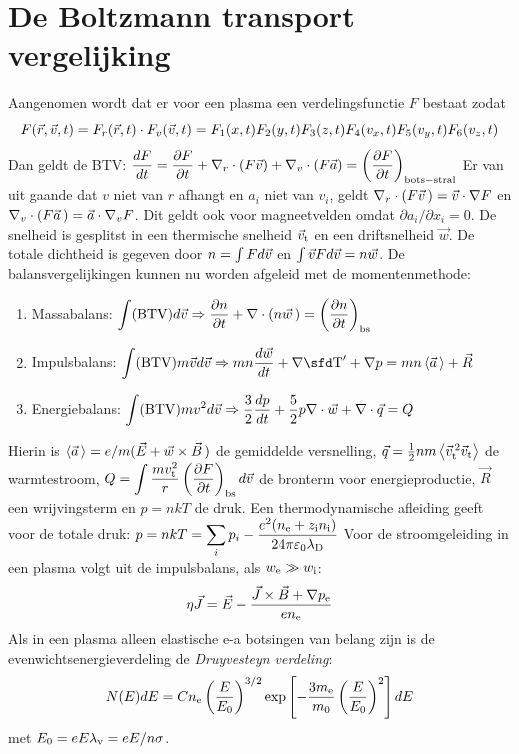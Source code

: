 \documentclass[twoside]{report}
\begin{document}
\section{De Boltzmann transport vergelijking}
Aangenomen wordt dat er voor een plasma een verdelingsfunctie $F$ bestaat zodat
\[
F(\rr,\vv,t)=F_r(\rr,t)\cdot F_v(\vv,t)=F_1(x,t)F_2(y,t)F_3(z,t)F_4(v_x,t)F_5(v_y,t)F_6(v_z,t)
\]
Dan geldt de BTV:
$\displaystyle
\frac{dF}{dt}=\Q{F}{t}+\nabla_r\cdot(F\vv)+\nabla_v\cdot(F\aaa)=\Qc{F}{t}{\rm bots-stral}
$
\npar
Er van uit gaande dat $v$ niet van $r$ afhangt en $a_i$ niet van $v_i$, geldt
$\nabla_r\cdot(F\vv\,)=\vv\cdot\nabla F$ en
$\nabla_v\cdot(F\aaa\,)=\aaa\cdot\nabla_vF$. Dit geldt ook voor magneetvelden
omdat $\partial a_i/\partial x_i=0$. De snelheid is gesplitst in een
thermische snelheid $\vv_{\rm t}$ en een driftsnelheid $\vec{w}$. De totale
dichtheid is gegeven door $n=\int Fd\vv$ en $\int\vv Fd\vv=n\vec{w}$.
\npar
De balansvergelijkingen kunnen nu worden afgeleid met de momentenmethode:
\begin{enumerate}
\item Massabalans: $\displaystyle\int({\rm BTV})d\vv\Rightarrow\Q{n}{t}+\nabla\cdot(n\vvec{w})=\Qc{n}{t}{\rm bs}$
\item Impulsbalans: $\displaystyle\int({\rm BTV})m\vv d\vv\Rightarrow mn\frac{d\vec{w}}{dt}+\nabla \TT'+\nabla p=mn\av{\aaa\,}+\vec{R}$
\item Energiebalans: $\displaystyle\int({\rm BTV})mv^2d\vv\Rightarrow\frac{3}{2}\frac{dp}{dt}+\frac{5}{2}p\nabla\cdot\vec{w}+\nabla\cdot\vec{q}=Q$
\end{enumerate}
Hierin is $\av{\aaa\,}=e/m(\vec{E}+\vec{w}\times\vvec{B})$ de gemiddelde
versnelling, $\vec{q}=\half nm\av{\vv_{\rm t}^{\,2}\vv_{\rm t}}$ de warmtestroom,
$\displaystyle Q=\int\frac{mv_{\rm t}^2}{r}\Qc{F}{t}{\rm bs}d\vv$ de bronterm
voor energieproductie, $\vec{R}$ een wrijvingsterm en $p=nkT$ de druk.
\npar
Een thermodynamische afleiding geeft voor de totale druk:
$\displaystyle p=nkT=\sum_ip_i-\frac{e^2(\ne+z_{\rm i}\ni)}{24\pi\varepsilon_0\lambda_{\rm D}}$
\npar
Voor de stroomgeleiding in een plasma volgt uit de impulsbalans, als
$w_{\rm e}\gg w_{\rm i}$:
\[
\eta\vec{J}=\vec{E}-\frac{\vec{J}\times\vec{B}+\nabla p_{\rm e}}{e\ne}
\]
Als in een plasma alleen elastische e-a botsingen van belang zijn is de
evenwichtsenergieverdeling de {\it Druyvesteyn verdeling}:
\[
N(E)dE=C\ne\left(\frac{E}{E_0}\right)^{3/2}\exp\left[-\frac{3\me}{m_0}\left(\frac{E}{E_0}\right)^2\right]dE
\]
met $E_0=eE\lambda_{\rm v}=eE/n\sigma$.
\end{document}
